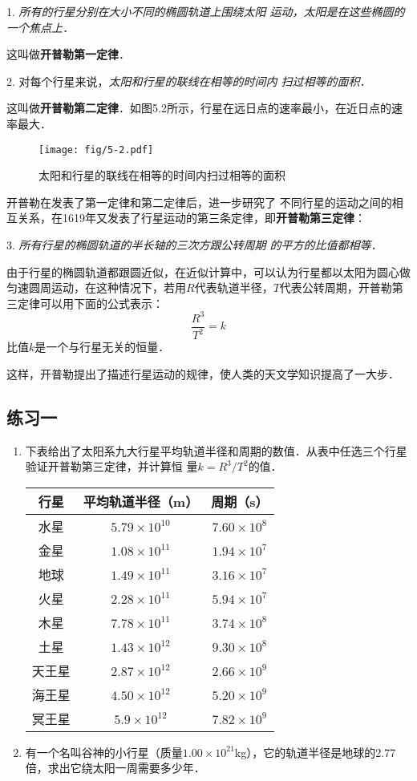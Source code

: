 1. \textit{所有的行星分别在大小不同的椭圆轨道上围绕太阳
运动，太阳是在这些椭圆的一个焦点上．}

这叫做\textbf{开普勒第一定律}．

2. 对每个行星来说，\textit{太阳和行星的联线在相等的时间内
扫过相等的面积．}

这叫做\textbf{开普勒第二定律}．如图5.2所示，行星在远日点的速率最小，在近日点的速率最大．
\begin{figure}\centering
\texttt{[image: fig/5-2.pdf]}
\caption{太阳和行星的联线在相等的时间内扫过相等的面积
}
\end{figure}


开普勒在发表了第一定律和第二定律后，进一步研究了	
不同行星的运动之间的相互关系，在1619年又发表了行星运动的第三条定律，即\textbf{开普勒第三定律}：

3. \textit{所有行星的椭圆轨道的半长轴的三次方跟公转周期
的平方的比值都相等．}


由于行星的椭圆轨道都跟圆近似，在近似计算中，可以认为行星都以太阳为圆心做匀速圆周运动，在这种情况下，若用$R$代表轨道半径，$T$代表公转周期，开普勒第三定律可以用下面的公式表示：
\[\frac{R^3}{T^2}=k \]
比值$k$是一个与行星无关的恒量．

这样，开普勒提出了描述行星运动的规律，使人类的天文学知识提高了一大步．	
	
	
\subsection*{练习一}
\begin{enumerate}
	\item 下表给出了太阳系九大行星平均轨道半径和周期的数值．从表中任选三个行星验证开普勒第三定律，并计算恒
	量$k=R^3/T^2$的值．
\begin{center}
	\begin{tabular}{ccc}
\hline
行星    &  平均轨道半径（m）  & 周期（s）\\
\hline
水星      &  $5.79\times 10^{10}$    & $7.60\times 10^8$ \\ 
金星    &  $1.08\times 10^{11}$    &  $1.94\times 10^7$ \\ 
地球    &  $1.49\times 10^{11}$    &  $3.16\times 10^7$ \\ 
火星    &  $2.28\times 10^{11}$    &  $5.94\times 10^7$ \\ 
木星    &  $7.78\times 10^{11}$    &  $3.74\times 10^8$ \\ 
土星    &  $1.43\times 10^{12}$    &  $9.30\times 10^8$ \\ 
天王星    & $2.87\times 10^{12}$     &  $2.66\times 10^9$ \\ 
海王星    &  $4.50\times 10^{12}$    &  $5.20\times 10^9$ \\ 
冥王星    & $5.9\times 10^{12}$     &  $7.82\times 10^9$ \\ 
\hline
	\end{tabular}
\end{center}

\item 有一个名叫谷神的小行星（质量$1.00\times 10^{21}$kg），它的轨道半径是地球的2.77倍，求出它绕太阳一周需要多少年．
\end{enumerate}

